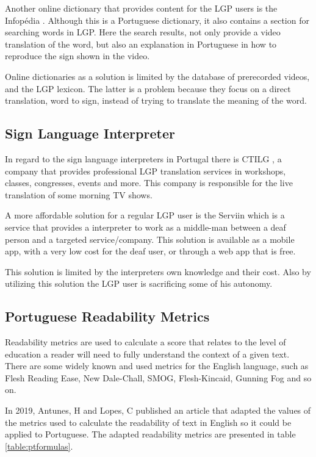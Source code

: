 \documentclass[runningheads]{llncs}
\begin{document}
Another online dictionary that provides content for the LGP users is the Infopédia \cite{infopedia_2020}.
Although this is a Portuguese dictionary, it also contains a section for searching words in LGP.
Here the search results, not only provide a video translation of the word, but also an explanation in Portuguese in how to reproduce the sign shown in the video.

Online dictionaries as a solution is limited by the database of prerecorded videos, and the LGP lexicon.
The latter is a problem because they focus on a direct translation, word to sign, instead of trying to translate the meaning of the word.

\subsection{Sign Language Interpreter}

In regard to the sign language interpreters in Portugal there is CTILG \cite{ctilg_2020}, a company that provides professional LGP translation services in workshops, classes, congresses, events and more.
This company is responsible for the live translation of some morning TV shows.

A more affordable solution for a regular LGP user is the Serviin \cite{serviin_2020} which is a service that provides a interpreter to work as a middle-man between a deaf person and a targeted service/company.
This solution is available as a mobile app, with a very low cost for the deaf user, or through a  web app that is free.

This solution is limited by the interpreters own knowledge and their cost.
Also by utilizing this solution the LGP user is sacrificing some of his autonomy.

\subsection{Portuguese Readability Metrics}

Readability metrics are used to calculate a score that relates to the level of education a reader will need to fully understand the context of a given text.
There are some widely known and used metrics for the English language, such as Flesh Reading Ease, New Dale-Chall, SMOG, Flesh-Kincaid, Gunning Fog and so on.

In 2019, Antunes, H and Lopes, C published an article \cite{ptread_2019} that adapted the values of the metrics used to calculate the readability of text in English so it could be applied to Portuguese.
The adapted readability metrics are presented in table \ref{table:ptformulas}.
\end{document}
